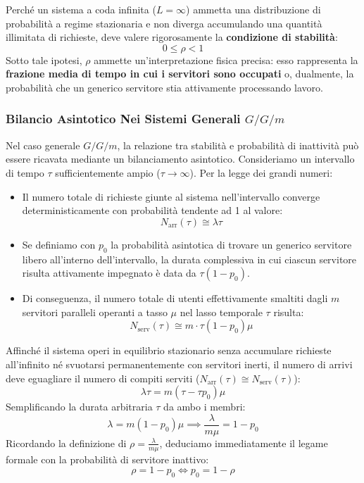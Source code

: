 \documentclass[11pt, a4paper]{article}
\begin{document}
Perché un sistema a coda infinita ($L = \infty$) ammetta una distribuzione di probabilità a regime stazionaria e non diverga accumulando una quantità illimitata di richieste, deve valere rigorosamente la \textbf{condizione di stabilità}:
\[
    \boxed{0 \le \rho < 1}
\]
Sotto tale ipotesi, $\rho$ ammette un'interpretazione fisica precisa: esso rappresenta la \textbf{frazione media di tempo in cui i servitori sono occupati} o, dualmente, la probabilità che un generico servitore stia attivamente processando lavoro.

\subsubsection{Bilancio Asintotico Nei Sistemi Generali \texorpdfstring{$G/G/m$}{G/G/m}}

Nel caso generale $G/G/m$, la relazione tra stabilità e probabilità di inattività può essere ricavata mediante un bilanciamento asintotico. Consideriamo un intervallo di tempo $\tau$ sufficientemente ampio ($\tau \to \infty$). Per la legge dei grandi numeri:
\begin{itemize}[leftmargin=*]
    \item Il numero totale di richieste giunte al sistema nell'intervallo converge deterministicamente con probabilità tendente ad 1 al valore:
    \[
        N_{\text{arr}}(\tau) \cong \lambda \tau
    \]
    \item Se definiamo con $p_0$ la probabilità asintotica di trovare un generico servitore libero all'interno dell'intervallo, la durata complessiva in cui ciascun servitore risulta attivamente impegnato è data da $\tau(1 - p_0)$.
    \item Di conseguenza, il numero totale di utenti effettivamente smaltiti dagli $m$ servitori paralleli operanti a tasso $\mu$ nel lasso temporale $\tau$ risulta:
    \[
        N_{\text{serv}}(\tau) \cong m \cdot \tau (1 - p_0) \mu
    \]
\end{itemize}
Affinché il sistema operi in equilibrio stazionario senza accumulare richieste all'infinito né svuotarsi permanentemente con servitori inerti, il numero di arrivi deve eguagliare il numero di compiti serviti ($N_{\text{arr}}(\tau) \cong N_{\text{serv}}(\tau)$):
\[
    \lambda \tau = m(\tau - \tau p_0)\mu
\]
Semplificando la durata arbitraria $\tau$ da ambo i membri:
\[
    \lambda = m (1 - p_0) \mu \implies \frac{\lambda}{m \mu} = 1 - p_0
\]
Ricordando la definizione di $\rho = \frac{\lambda}{m\mu}$, deduciamo immediatamente il legame formale con la probabilità di servitore inattivo:
\[
    \boxed{\rho = 1 - p_0 \iff p_0 = 1 - \rho}
\]
\end{document}
